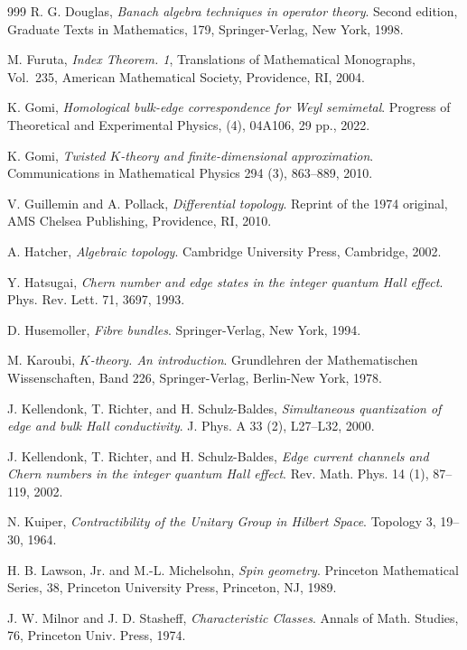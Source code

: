 \documentclass{amsart}
\theoremstyle{definition}
\theoremstyle{remark}
\begin{document}
\begin{thebibliography}{999}
R. G. Douglas,
\textit{Banach algebra techniques in operator theory}.
Second edition, Graduate Texts in Mathematics, 179, Springer-Verlag, New York, 1998.

M. Furuta, 
\textit{Index Theorem. 1}, 
Translations of Mathematical Monographs, Vol.~235, American Mathematical Society, Providence, RI, 2004.

K. Gomi,
\textit{Homological bulk-edge correspondence for Weyl semimetal}.
Progress of Theoretical and Experimental Physics, (4), 04A106, 29 pp., 2022.

K. Gomi,
\textit{Twisted $K$-theory and finite-dimensional approximation}.
Communications in Mathematical Physics 294 (3), 863--889, 2010.

V. Guillemin and A. Pollack,
\textit{Differential topology}.
Reprint of the 1974 original, AMS Chelsea Publishing, Providence, RI, 2010.

A. Hatcher,
\textit{Algebraic topology}.
Cambridge University Press, Cambridge, 2002.

Y. Hatsugai,
\textit{Chern number and edge states in the integer quantum Hall effect}.
Phys. Rev. Lett. 71, 3697, 1993.

D. Husemoller,
\textit{Fibre bundles}.
Springer-Verlag, New York, 1994.

M. Karoubi,
\textit{$K$-theory. An introduction}.
Grundlehren der Mathematischen Wissenschaften, Band 226, Springer-Verlag, Berlin-New York, 1978.

J. Kellendonk, T. Richter, and H. Schulz-Baldes,
\textit{Simultaneous quantization of edge and bulk Hall conductivity}.
J. Phys. A 33 (2), L27--L32, 2000.

J. Kellendonk, T. Richter, and H. Schulz-Baldes,
\textit{Edge current channels and Chern numbers in the integer quantum Hall effect}.
Rev. Math. Phys. 14 (1), 87--119, 2002.

N. Kuiper,
\textit{Contractibility of the Unitary Group in Hilbert Space}.
Topology 3, 19--30, 1964.

H. B. Lawson, Jr. and M.-L. Michelsohn,
\textit{Spin geometry}.
Princeton Mathematical Series, 38, Princeton University Press, Princeton, NJ, 1989.

J. W. Milnor and J. D. Stasheff,
\textit{Characteristic Classes}.
Annals of Math. Studies, 76, Princeton Univ. Press, 1974.


\end{thebibliography}
\end{document}
